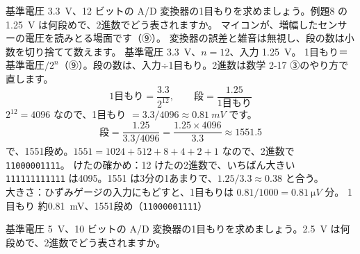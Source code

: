 \label{ph:原-10:ex11}
\begin{phreidai}
基準電圧 \qty{3.3}{V}、12 ビットの A/D 変換器の1目もりを求めましょう。例題8 の \qty{1.25}{V} は何段めで、2進数でどう表されますか。
\phbamen
マイコンが、増幅したセンサーの電圧を読みとる場面です（⑨）。
\phmushi
変換器の誤差と雑音は無視し、段の数は小数を切り捨てて数えます。
\phzu
基準電圧 \qty{3.3}{V}、$n=12$、入力 \qty{1.25}{V}。
\phriyu
1目もり＝基準電圧$/2^n$（⑨）。段の数は、入力÷1目もり。2進数は数学 2-17 ③のやり方で直します。
\phtateru
\[ \text{1目もり}=\frac{3.3}{2^{12}},\qquad \text{段}=\frac{1.25}{\text{1目もり}} \]
\phtoku
$2^{12}=4096$ なので、1目もり $=3.3/4096\approx\qty{0.81}{mV}$ です。
\[ \text{段}=\frac{1.25}{3.3/4096}=\frac{1.25\times4096}{3.3}\approx1551.5 \]
で、1551段め。$1551=1024+512+8+4+2+1$ なので、2進数で \texttt{11000001111}。
\phtashikame
けたの確かめ：12 けたの2進数で、いちばん大きい \texttt{111111111111} は4095。1551 は3分の1あまりで、$1.25/3.3\approx0.38$ と合う。\\
大きさ：ひずみゲージの入力にもどすと、1目もりは $0.81/1000=\qty{0.81}{\micro V}$ 分。
\kotae 1目もり 約\qty{0.81}{mV}、1551段め（\texttt{11000001111}）
\end{phreidai}
\begin{jibun}
基準電圧 \qty{5}{V}、10 ビットの A/D 変換器の1目もりを求めましょう。\qty{2.5}{V} は何段めで、2進数でどう表されますか。
\end{jibun}

